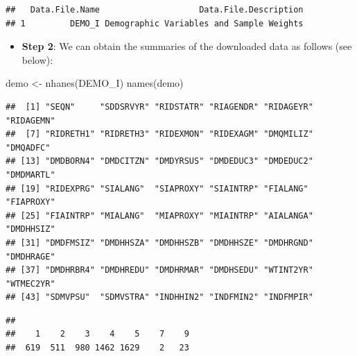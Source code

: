 \documentclass[
]{book}
\newenvironment{Shaded}{\begin{snugshade}}{\end{snugshade}}
\newcommand{\FunctionTok}[1]{\textcolor[rgb]{0.00,0.00,0.00}{#1}}
\newcommand{\NormalTok}[1]{#1}
\newcommand{\OtherTok}[1]{\textcolor[rgb]{0.56,0.35,0.01}{#1}}
\newcommand{\SpecialCharTok}[1]{\textcolor[rgb]{0.00,0.00,0.00}{#1}}
\newcommand{\StringTok}[1]{\textcolor[rgb]{0.31,0.60,0.02}{#1}}
\providecommand{\tightlist}{%
  \setlength{\itemsep}{0pt}\setlength{\parskip}{0pt}}
\begin{document}
\begin{verbatim}
##   Data.File.Name                    Data.File.Description
## 1         DEMO_I Demographic Variables and Sample Weights
\end{verbatim}

\begin{itemize}
\tightlist
\item
  \textbf{Step 2}: We can obtain the summaries of the downloaded data as follows (see below):
\end{itemize}

\begin{Shaded}
\begin{Highlighting}[]
\NormalTok{demo }\OtherTok{\textless{}{-}} \FunctionTok{nhanes}\NormalTok{(}\StringTok{\textquotesingle{}DEMO\_I\textquotesingle{}}\NormalTok{)}
\FunctionTok{names}\NormalTok{(demo)}
\end{Highlighting}
\end{Shaded}

\begin{verbatim}
##  [1] "SEQN"     "SDDSRVYR" "RIDSTATR" "RIAGENDR" "RIDAGEYR" "RIDAGEMN"
##  [7] "RIDRETH1" "RIDRETH3" "RIDEXMON" "RIDEXAGM" "DMQMILIZ" "DMQADFC" 
## [13] "DMDBORN4" "DMDCITZN" "DMDYRSUS" "DMDEDUC3" "DMDEDUC2" "DMDMARTL"
## [19] "RIDEXPRG" "SIALANG"  "SIAPROXY" "SIAINTRP" "FIALANG"  "FIAPROXY"
## [25] "FIAINTRP" "MIALANG"  "MIAPROXY" "MIAINTRP" "AIALANGA" "DMDHHSIZ"
## [31] "DMDFMSIZ" "DMDHHSZA" "DMDHHSZB" "DMDHHSZE" "DMDHRGND" "DMDHRAGE"
## [37] "DMDHRBR4" "DMDHREDU" "DMDHRMAR" "DMDHSEDU" "WTINT2YR" "WTMEC2YR"
## [43] "SDMVPSU"  "SDMVSTRA" "INDHHIN2" "INDFMIN2" "INDFMPIR"
\end{verbatim}

\begin{Shaded}
\end{Shaded}

\begin{verbatim}
## 
##    1    2    3    4    5    7    9 
##  619  511  980 1462 1629    2   23
\end{verbatim}

\begin{Shaded}
\end{Shaded}
\end{document}
